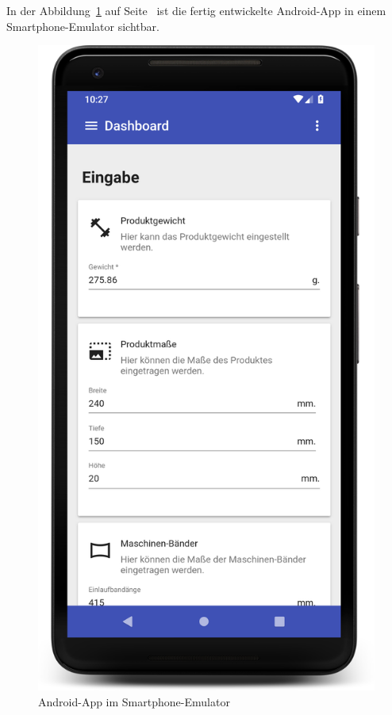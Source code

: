In der Abbildung~\ref{fig:umsetzung_android_app} auf Seite~\pageref{fig:umsetzung_android_app} ist die fertig
entwickelte Android-App in einem Smartphone-Emulator sichtbar.

\begin{figure}[h]
    \centering
    \includegraphics[scale=0.095]{images/kapitel_4/android_app.png}
    \caption{Android-App im Smartphone-Emulator}
    \label{fig:umsetzung_android_app}
\end{figure}

